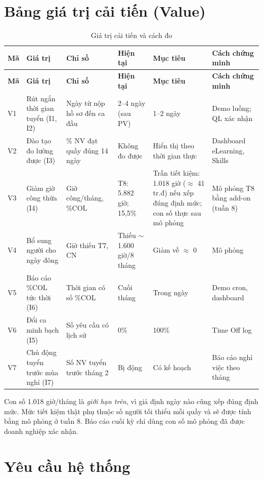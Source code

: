 \documentclass[12pt,a4paper,oneside]{report}
\begin{document}
\section{Bảng giá trị cải tiến (Value)}
\begin{longtable}{C{0.7cm}L{2.7cm}L{2.5cm}L{2.2cm}L{2.6cm}L{2.4cm}}
\caption{Giá trị cải tiến và cách đo}\label{tab:value}\\
\toprule \textbf{Mã} & \textbf{Giá trị} & \textbf{Chỉ số} & \textbf{Hiện tại} & \textbf{Mục tiêu} & \textbf{Cách chứng minh} \\\midrule\endfirsthead
\toprule \textbf{Mã} & \textbf{Giá trị} & \textbf{Chỉ số} & \textbf{Hiện tại} & \textbf{Mục tiêu} & \textbf{Cách chứng minh} \\\midrule\endhead
V1 & Rút ngắn thời gian tuyển (I1, I2) & Ngày từ nộp hồ sơ đến ca đầu & 2–4 ngày (sau PV) & 1–2 ngày & Demo luồng; QL xác nhận \\
V2 & Đào tạo đo lường được (I3) & \% NV đạt quầy đúng 14 ngày & Không đo được & Hiển thị theo thời gian thực & Dashboard eLearning, Skills \\
V3 & Giảm giờ công thừa (I4) & Giờ công/tháng, \%COL & T8: 5.882 giờ; 15,5\% & Trần tiết kiệm: 1.018 giờ ($\approx$ 41 tr.đ) nếu xếp đúng định mức; con số thực sau mô phỏng & Mô phỏng T8 bằng add-on (tuần 8) \\
V4 & Bổ sung người cho ngày đông & Giờ thiếu T7, CN & Thiếu $\sim$1.600 giờ/8 tháng & Giảm về $\approx$ 0 & Mô phỏng \\
V5 & Báo cáo \%COL tức thời (I6) & Thời gian có số \%COL & Cuối tháng & Trong ngày & Demo cron, dashboard \\
V6 & Đổi ca minh bạch (I5) & Số yêu cầu có lịch sử & 0\% & 100\% & Time Off log \\
V7 & Chủ động tuyển trước mùa nghỉ (I7) & Số NV tuyển trước tháng 2 & Bị động & Có kế hoạch & Báo cáo nghỉ việc theo tháng \\
\bottomrule
\end{longtable}

\begin{ghichu}
Con số 1.018 giờ/tháng là \emph{giới hạn trên}, vì giả định ngày nào cũng xếp đúng định mức. Mức tiết kiệm thật phụ thuộc số người tối thiểu mỗi quầy và sẽ được tính bằng mô phỏng ở tuần 8. Báo cáo cuối kỳ chỉ dùng con số mô phỏng đã được doanh nghiệp xác nhận.
\end{ghichu}

\section{Yêu cầu hệ thống}
\end{document}
